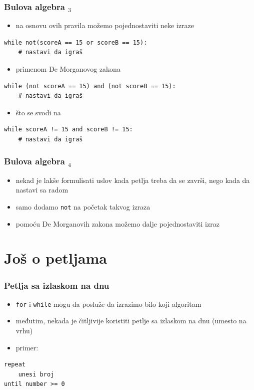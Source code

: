 \documentclass[utf8,compress]{beamer}
\begin{document}
\begin{frame}[fragile]
  \frametitle{Bulova algebra $_3$}
  \begin{itemize}
    \item na osnovu ovih pravila možemo pojednostaviti neke izraze
  \end{itemize}
\begin{verbatim}
while not(scoreA == 15 or scoreB == 15):
    # nastavi da igraš
\end{verbatim}
  \begin{itemize}
    \item primenom De Morganovog zakona
  \end{itemize}
\begin{verbatim}
while (not scoreA == 15) and (not scoreB == 15):
    # nastavi da igraš
\end{verbatim}
  \begin{itemize}
    \item što se svodi na
  \end{itemize}
\begin{verbatim}
while scoreA != 15 and scoreB != 15:
    # nastavi da igraš
\end{verbatim}
\end{frame}

\begin{frame}[fragile]
  \frametitle{Bulova algebra $_4$}
  \begin{itemize}
    \item nekad je lakše formulisati uslov kada petlja treba da se završi, nego kada da nastavi sa radom
    \item samo dodamo \texttt{not} na početak takvog izraza
    \item pomoću De Morganovih zakona možemo dalje pojednostaviti izraz
  \end{itemize}
\end{frame}

\section[Petlje 2]{Još o petljama}

\begin{frame}[fragile]
  \frametitle{Petlja sa izlaskom na dnu}
  \begin{itemize}
    \item \texttt{for} i \texttt{while} mogu da posluže da izrazimo bilo koji algoritam
    \item međutim, nekada je čitljivije koristiti petlje sa izlaskom na dnu (umesto na vrhu)
    \item primer:
  \end{itemize}
\begin{verbatim}
repeat
    unesi broj 
until number >= 0
\end{verbatim}
\end{frame}
\end{document}
